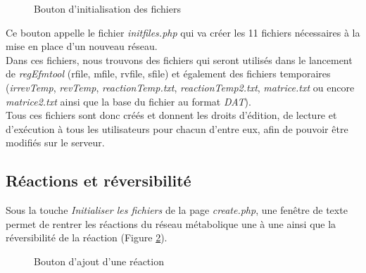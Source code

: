 \begin{figure}[!ht]
    \begin{center}
        \caption{Bouton d'initialisation des fichiers}
          \label{boutonInit}
      \end{center}   
\end{figure}

Ce bouton appelle le fichier \emph{initfiles.php} qui va créer les 11 fichiers nécessaires à la mise en place d'un nouveau réseau.\\
Dans ces fichiers, nous trouvons des fichiers qui seront utilisés dans le lancement de \emph{regEfmtool} (rfile, mfile, rvfile, sfile) et également des fichiers temporaires (\emph{irrevTemp}, \emph{revTemp}, \emph{reactionTemp.txt}, \emph{reactionTemp2.txt}, \emph{matrice.txt} ou encore \emph{matrice2.txt} ainsi que la base du fichier au format \emph{DAT}).\\
Tous ces fichiers sont donc créés et donnent les droits d'édition, de lecture et d'exécution à tous les utilisateurs pour chacun d'entre eux, afin de pouvoir être modifiés sur le serveur.

\subsection{Réactions et réversibilité}
Sous la touche \emph{Initialiser les fichiers} de la page \emph{create.php}, une fenêtre de texte permet de rentrer les réactions du réseau métabolique une à une ainsi que la réversibilité de la réaction (Figure \ref{boutonAjout}).

\begin{figure}[!ht]
    \begin{center}
        \caption{Bouton d'ajout d'une réaction}
          \label{boutonAjout}
      \end{center}   
\end{figure}


